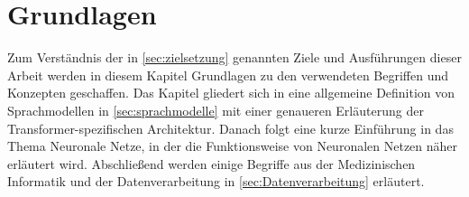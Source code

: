 \chapter{Grundlagen}\label{ch:preliminaries}








Zum Verständnis der in \cref{sec:zielsetzung} genannten Ziele und Ausführungen dieser Arbeit werden in diesem Kapitel Grundlagen zu den verwendeten Begriffen und Konzepten geschaffen.
Das Kapitel gliedert sich in eine allgemeine Definition von Sprachmodellen in \cref{sec:sprachmodelle} mit einer genaueren Erläuterung der Transformer-spezifischen Architektur.
Danach folgt eine kurze Einführung in das Thema Neuronale Netze, in der die Funktionsweise von Neuronalen Netzen näher erläutert wird.
Abschließend werden einige Begriffe aus der Medizinischen Informatik und der Datenverarbeitung in \cref{sec:Datenverarbeitung} erläutert.

